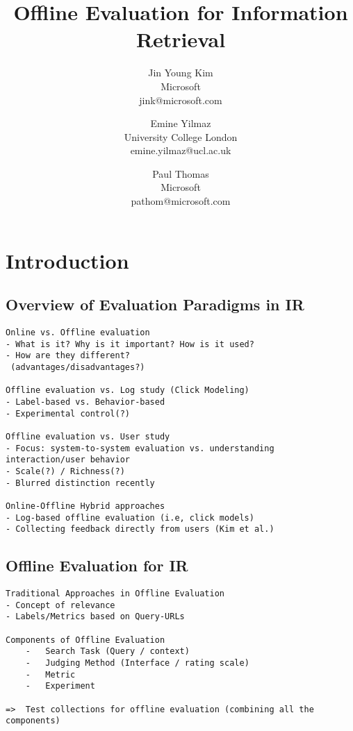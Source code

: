 \documentclass[openany]{now} %
\title{Offline Evaluation for Information Retrieval}
\author{
Jin Young Kim \\
Microsoft \\
jink@microsoft.com
\and
Emine Yilmaz \\
University College London \\
emine.yilmaz@ucl.ac.uk
\and
Paul Thomas \\
Microsoft \\
pathom@microsoft.com
}
\begin{document}

\frontmatter  %

\maketitle

\tableofcontents

\mainmatter

\begin{abstract}

\end{abstract}

\chapter{Introduction}
\label{c-intro} %

\section{Overview of Evaluation Paradigms in IR}

\begin{verbatim}
Online vs. Offline evaluation
- What is it? Why is it important? How is it used?
- How are they different?
 (advantages/disadvantages?)

Offline evaluation vs. Log study (Click Modeling)
- Label-based vs. Behavior-based
- Experimental control(?)

Offline evaluation vs. User study
- Focus: system-to-system evaluation vs. understanding interaction/user behavior
- Scale(?) / Richness(?)
- Blurred distinction recently

Online-Offline Hybrid approaches
- Log-based offline evaluation (i.e, click models)
- Collecting feedback directly from users (Kim et al.)
\end{verbatim}

\cite{INR-XYZ}

\section{Offline Evaluation for IR}

\begin{verbatim}
Traditional Approaches in Offline Evaluation
- Concept of relevance 
- Labels/Metrics based on Query-URLs

Components of Offline Evaluation
	-	Search Task (Query / context)
	-	Judging Method (Interface / rating scale) 
	-	Metric
	-	Experiment

=>	Test collections for offline evaluation (combining all the components)

\end{verbatim}
\end{document}
